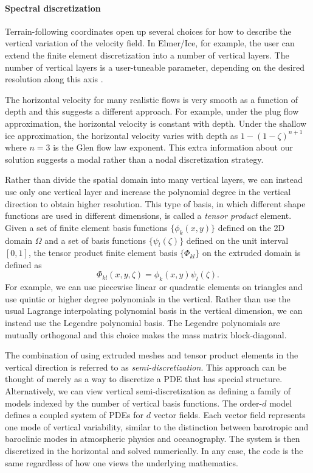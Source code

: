 \documentclass{article}
\theoremstyle{definition}
\theoremstyle{plain}
\begin{document}
\paragraph{Spectral discretization}

Terrain-following coordinates open up several choices for how to describe the vertical variation of the velocity field.
In Elmer/Ice, for example, the user can extend the finite element discretization into a number of vertical layers.
The number of vertical layers is a user-tuneable parameter, depending on the desired resolution along this axis \citep{gagliardini2013capabilities}.

The horizontal velocity for many realistic flows is very smooth as a function of depth and this suggests a different approach.
For example, under the plug flow approximation, the horizontal velocity is constant with depth.
Under the shallow ice approximation, the horizontal velocity varies with depth as $1 - (1 - \zeta)^{n + 1}$ where $n = 3$ is the Glen flow law exponent.
This extra information about our solution suggests a modal rather than a nodal discretization strategy.

Rather than divide the spatial domain into many vertical layers, we can instead use only one vertical layer and increase the polynomial degree in the vertical direction to obtain higher resolution.
This type of basis, in which different shape functions are used in different dimensions, is called a \emph{tensor product} element.
Given a set of finite element basis functions $\{\phi_k(x, y)\}$ defined on the 2D domain $\Omega$ and a set of basis functions $\{\psi_l(\zeta)\}$ defined on the unit interval $[0, 1]$, the tensor product finite element basis $\{\Phi_{kl}\}$ on the extruded domain is defined as
\begin{equation}
    \Phi_{kl}(x, y, \zeta) = \phi_k(x, y)\psi_l(\zeta).
\end{equation}
For example, we can use piecewise linear or quadratic elements on triangles and use quintic or higher degree polynomials in the vertical.
Rather than use the usual Lagrange interpolating polynomial basis in the vertical dimension, we can instead use the Legendre polynomial basis.
The Legendre polynomials are mutually orthogonal and this choice makes the mass matrix block-diagonal.

The combination of using extruded meshes and tensor product elements in the vertical direction is referred to as \emph{semi-discretization}.
This approach can be thought of merely as a way to discretize a PDE that has special structure.
Alternatively, we can view vertical semi-discretization as defining a family of models indexed by the number of vertical basis functions.
The order-$d$ model defines a coupled system of PDEs for $d$ vector fields.
Each vector field represents one mode of vertical variability, similar to the distinction between barotropic and baroclinic modes in atmospheric physics and oceanography.
The system is then discretized in the horizontal and solved numerically.
In any case, the code is the same regardless of how one views the underlying mathematics.
\end{document}
